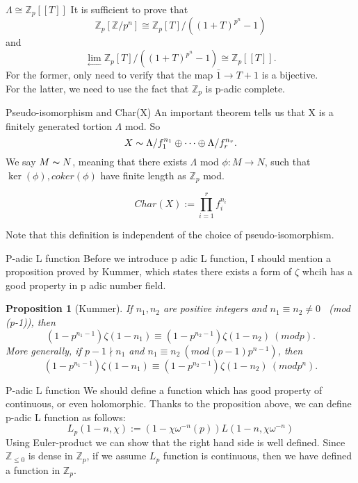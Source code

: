 \documentclass{beamer}
\theoremstyle{plain}
\newtheorem{proposition}{Proposition}[section]
\theoremstyle{definition}
\theoremstyle{remark}
\newcommand{\Z}{\mathbb{Z}}
\begin{document}
\begin{frame}{$\Lambda \cong \Z_p[[T]]$}
  It is sufficient to prove that 
  \[ \Z_p[\Z/p^n] \cong \Z_p[T]/((1+T)^{p^n}-1)\]
  and 
  \[\lim_{\leftarrow}\Z_p[T]/((1+T)^{p^n}-1) \cong \Z_p[[T]]. \]
  For the former, only need to verify that the map $\bar{1} \to T+1$ is a bijective.\\
  For the latter, we need to use the fact that $\Z_p$ is p-adic complete.

\end{frame}

\begin{frame}{Pseudo-isomorphism and Char(X)}
  An important theorem tells us that X is a finitely generated tortion $\Lambda$ mod.
  So \[ X \thicksim  \Lambda/f_1^{n_1} \oplus \cdots \oplus \Lambda/f_r^{n_r} . \]
  We say $M \thicksim N$, meaning that there exists $\Lambda$ mod 
  $ \phi: M \to N$, such that $\ker(\phi), coker(\phi)$ have finite length as $\Z_p$ mod.
  \begin{definition}
    \[Char(X):=\prod_{i=1}^{r} f_i^{n_i}\]
  \end{definition}
  Note that this definition is independent of the choice of pseudo-isomorphism.

\end{frame}

\begin{frame}{P-adic L function}
  Before we introduce p adic L function, I should mention a proposition proved by 
  Kummer, which states there exists a form of $\zeta$ whcih has a good property in p adic number field.
  \begin{proposition}[Kummer]
    If $n_1,n_2$ are positive integers and $n_1 \equiv n_2 \neq 0 $ \ (mod (p-1)),
    then \[(1-p^{n_1-1})\zeta(1-n_1) \equiv (1-p^{n_2-1})\zeta(1-n_2) \ (mod p).\]
    More generally, if $p-1 \nmid n_1$ and $n_1 \equiv n_2 \ (mod (p-1)p^{n-1})$,
    then \[ (1-p^{n_1-1})\zeta(1-n_1) \equiv (1-p^{n_2-1})\zeta(1-n_2) \ (mod p^n). \]
  \end{proposition}
\end{frame}

\begin{frame}{P-adic L function}
  We should define a function which has good property of continuous, or even
  holomorphic. Thanks to the proposition above, we can define p-adic L function as follows:
  \[ L_p(1-n,\chi) := (1-\chi \omega^{-n}(p)) L(1-n,\chi \omega^{-n})\]
  Using Euler-product we can show that the right hand side is well defined. Since $\Z_{\le 0}$ 
  is dense in $\Z_p$, if we assume $L_p$ function is continuous, then we have defined a function in $\Z_p$.

\end{frame}
\end{document}
